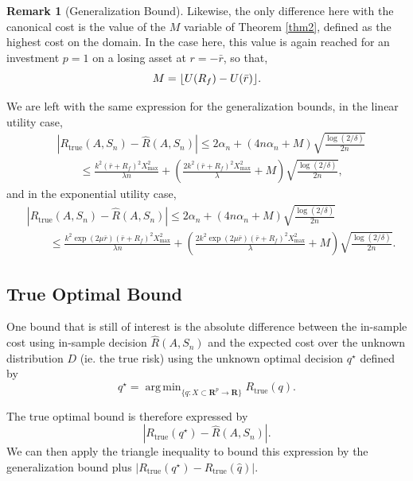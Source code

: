 \documentclass[11pt]{article}
\DeclareMathOperator*{\argmin}{arg\,min}
\DeclarePairedDelimiter\floor{\lfloor}{\rfloor}
\newcommand{\real}{\bm R}
\newcommand{\trueRisk}{R_{\mathrm{true}}}
\theoremstyle{plain}
\theoremstyle{definition}
\newtheorem*{rem}{Remark}
\begin{document}
\begin{rem}[Generalization Bound]
  Likewise, the only difference here with the canonical cost is the value of the $M$
  variable of Theorem \ref{thm2}, defined as the highest cost on the domain. In the case
  here, this value is again reached for an investment $p=1$ on a losing asset at $r=-\bar
  r$, so that,
  \begin{equation}
    M = \floor{U(R_f) - U(\bar r)}.
  \end{equation}

  We are left with the same expression for the generalization bounds, in the linear
  utility case,
  \begin{align}
    &|\trueRisk(A,S_n) - \hat{R}(A,S_n)| \leq 2\alpha_n + (4n\alpha_n +
      M)\sqrt{\frac{\log(2/\delta)}{2n}}\\
    &\qquad \leq \frac{k^2(\bar r+R_f)^2X^2_{\max}}{\lambda n} + \left(\frac{2k^2(\bar r+R_f)^2X^2_{\max}}{\lambda} + M\right)\sqrt{\frac{\log(2/\delta)}{2n}},
  \end{align}
  and in the exponential utility case, 
  \begin{align}
    &|\trueRisk(A,S_n) - \hat{R}(A,S_n)| \leq 2\alpha_n + (4n\alpha_n +
      M)\sqrt{\frac{\log(2/\delta)}{2n}}\\
    &\qquad \leq \frac{k^2 \exp(2\mu\bar r)(\bar r + R_f)^2 X^2_{\max}}{\lambda n} + \left(\frac{2k^2 \exp(2\mu\bar r)(\bar r + R_f)^2 X^2_{\max}}{\lambda} + M\right)\sqrt{\frac{\log(2/\delta)}{2n}}.
  \end{align}
\end{rem}

\subsection{True Optimal Bound}

One bound that is still of interest is the absolute difference between the in-sample cost
using in-sample decision $\hat R(A,S_n)$ and the expected cost over the unknown
distribution $D$ (ie. the true risk) using the unknown optimal decision $q^\star$ defined
by
\begin{equation}
  q^\star = \argmin_{\{q:X\subset\real^p\to\real\}}\trueRisk(q).
\end{equation}

The true optimal bound is therefore expressed by
\begin{equation}
|\trueRisk(q^\star) - \hat R(A,S_n)|.  
\end{equation}
We can then apply the triangle inequality to bound this expression by the generalization
bound plus $|\trueRisk(q^\star) - \trueRisk(\hat q)|$. 
\end{document}
